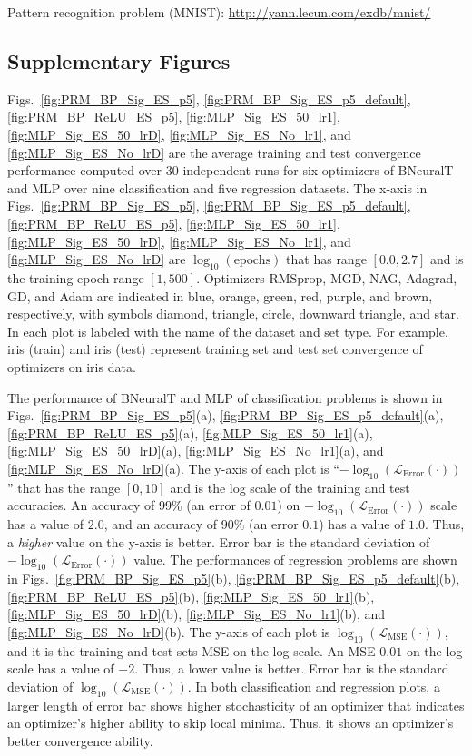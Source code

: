 \documentclass[11pt,a4paper]{article}
\begin{document}
    Pattern recognition problem (MNIST):
\url{http://yann.lecun.com/exdb/mnist/}


    \subsection{Supplementary Figures}
    \label{sec:convergece_figs}
    Figs.~\ref{fig:PRM_BP_Sig_ES_p5}, 
    \ref{fig:PRM_BP_Sig_ES_p5_default}, 
    \ref{fig:PRM_BP_ReLU_ES_p5}, 
    \ref{fig:MLP_Sig_ES_50_lr1},
    \ref{fig:MLP_Sig_ES_50_lrD}, 
    \ref{fig:MLP_Sig_ES_No_lr1}, and 
    \ref{fig:MLP_Sig_ES_No_lrD} 
are the average training and test convergence performance computed over 30 independent runs for six optimizers of BNeuralT  and MLP over nine classification and five regression datasets. The x-axis in 
Figs.~\ref{fig:PRM_BP_Sig_ES_p5}, 
    \ref{fig:PRM_BP_Sig_ES_p5_default}, 
    \ref{fig:PRM_BP_ReLU_ES_p5}, 
    \ref{fig:MLP_Sig_ES_50_lr1},
    \ref{fig:MLP_Sig_ES_50_lrD}, 
    \ref{fig:MLP_Sig_ES_No_lr1}, and 
    \ref{fig:MLP_Sig_ES_No_lrD}  
are $\log_{10}(\mbox{epochs})$ that has range $[0.0, 2.7]$ and is the training epoch range $[1, 500]$. Optimizers RMSprop, MGD, NAG, Adagrad, GD, and Adam are indicated in blue, orange, green, red, purple, and brown, respectively, with symbols diamond, triangle, circle, downward triangle, and star. In each plot is labeled with the name of the dataset and set type. For example, iris (train) and iris (test) represent training set and test set convergence of optimizers on iris data.
    
    The performance of BNeuralT and MLP of classification problems is shown in Figs.~\ref{fig:PRM_BP_Sig_ES_p5}(a), 
    \ref{fig:PRM_BP_Sig_ES_p5_default}(a), 
    \ref{fig:PRM_BP_ReLU_ES_p5}(a), 
    \ref{fig:MLP_Sig_ES_50_lr1}(a),
    \ref{fig:MLP_Sig_ES_50_lrD}(a), 
    \ref{fig:MLP_Sig_ES_No_lr1}(a), and 
    \ref{fig:MLP_Sig_ES_No_lrD}(a).
The y-axis of each plot is ``$-\log_{10}(\mathcal{L}_{\text{Error}}(\cdot))$'' that has the range $[0,10]$ and is the log scale of the training and test  accuracies. An  accuracy of $99$\% (an error of $0.01$) on $-\log_{10}(\mathcal{L}_{\text{Error}}(\cdot))$ scale has a value of $2.0$, and an accuracy of $90$\% (an error $0.1$) has a value of $1.0$. Thus, a \textit{higher} value on the y-axis is better. Error bar is the standard deviation of $-\log_{10}(\mathcal{L}_{\text{Error}}(\cdot))$ value. 
The performances of regression problems are shown in Figs.~\ref{fig:PRM_BP_Sig_ES_p5}(b), 
    \ref{fig:PRM_BP_Sig_ES_p5_default}(b), 
    \ref{fig:PRM_BP_ReLU_ES_p5}(b), 
    \ref{fig:MLP_Sig_ES_50_lr1}(b),
    \ref{fig:MLP_Sig_ES_50_lrD}(b), 
    \ref{fig:MLP_Sig_ES_No_lr1}(b), and 
    \ref{fig:MLP_Sig_ES_No_lrD}(b).  
The y-axis of each plot is $\log_{10}(\mathcal{L}_{\mbox{MSE}}(\cdot))$, and it is the training and test sets MSE on the log scale. An MSE $0.01$ on the log scale has a value of $-2$. Thus, a lower value is better. Error bar is the standard deviation of $\log_{10}(\mathcal{L}_{\text{MSE}}(\cdot))$. In both classification and regression plots, a larger length of error bar shows higher stochasticity of an optimizer that indicates an optimizer's higher ability to skip local minima. Thus, it shows an optimizer's better convergence ability.
\end{document}

